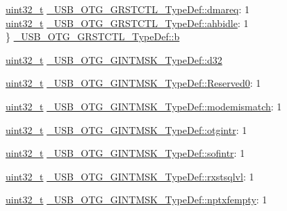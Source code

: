 \begin{DoxyCompactItemize}
\begin{tabbing}
\>\hyperlink{stdint_8h_a435d1572bf3f880d55459d9805097f62}{uint32\_t} \hyperlink{group___u_s_b___o_t_g___d_r_i_v_e_r_gad333c8546ac5b74a5a3ef8eb9377268d}{\_USB\_OTG\_GRSTCTL\_TypeDef::dmareq}: 1\\
\>\hyperlink{stdint_8h_a435d1572bf3f880d55459d9805097f62}{uint32\_t} \hyperlink{group___u_s_b___o_t_g___d_r_i_v_e_r_ga4247e798442e482943bbb22ed25cb1eb}{\_USB\_OTG\_GRSTCTL\_TypeDef::ahbidle}: 1\\
\} \hyperlink{group___u_s_b___o_t_g___d_r_i_v_e_r_ga0286fbf0d92a582c87cf8dc71ac1db47}{\_USB\_OTG\_GRSTCTL\_TypeDef::b}\\

\end{tabbing}\item 
\hyperlink{stdint_8h_a435d1572bf3f880d55459d9805097f62}{uint32\-\_\-t} \hyperlink{group___u_s_b___o_t_g___d_r_i_v_e_r_ga906343e7e2baec7515a156654b58d5df}{\-\_\-\-U\-S\-B\-\_\-\-O\-T\-G\-\_\-\-G\-I\-N\-T\-M\-S\-K\-\_\-\-Type\-Def\-::d32}
\item 
\hyperlink{stdint_8h_a435d1572bf3f880d55459d9805097f62}{uint32\-\_\-t} \hyperlink{group___u_s_b___o_t_g___d_r_i_v_e_r_gae70b4c3c3e4cd67e47bffb922442b1d1}{\-\_\-\-U\-S\-B\-\_\-\-O\-T\-G\-\_\-\-G\-I\-N\-T\-M\-S\-K\-\_\-\-Type\-Def\-::\-Reserved0}\-: 1
\item 
\hyperlink{stdint_8h_a435d1572bf3f880d55459d9805097f62}{uint32\-\_\-t} \hyperlink{group___u_s_b___o_t_g___d_r_i_v_e_r_ga77714304af3ece5bbc8fcd3ba715adc9}{\-\_\-\-U\-S\-B\-\_\-\-O\-T\-G\-\_\-\-G\-I\-N\-T\-M\-S\-K\-\_\-\-Type\-Def\-::modemismatch}\-: 1
\item 
\hyperlink{stdint_8h_a435d1572bf3f880d55459d9805097f62}{uint32\-\_\-t} \hyperlink{group___u_s_b___o_t_g___d_r_i_v_e_r_ga148fbc7761867493dd8af7b29cc5e764}{\-\_\-\-U\-S\-B\-\_\-\-O\-T\-G\-\_\-\-G\-I\-N\-T\-M\-S\-K\-\_\-\-Type\-Def\-::otgintr}\-: 1
\item 
\hyperlink{stdint_8h_a435d1572bf3f880d55459d9805097f62}{uint32\-\_\-t} \hyperlink{group___u_s_b___o_t_g___d_r_i_v_e_r_gace026c7872dc91338173935f546515a6}{\-\_\-\-U\-S\-B\-\_\-\-O\-T\-G\-\_\-\-G\-I\-N\-T\-M\-S\-K\-\_\-\-Type\-Def\-::sofintr}\-: 1
\item 
\hyperlink{stdint_8h_a435d1572bf3f880d55459d9805097f62}{uint32\-\_\-t} \hyperlink{group___u_s_b___o_t_g___d_r_i_v_e_r_ga49f035a272eee9454d65e15275cc76ea}{\-\_\-\-U\-S\-B\-\_\-\-O\-T\-G\-\_\-\-G\-I\-N\-T\-M\-S\-K\-\_\-\-Type\-Def\-::rxstsqlvl}\-: 1
\item 
\hyperlink{stdint_8h_a435d1572bf3f880d55459d9805097f62}{uint32\-\_\-t} \hyperlink{group___u_s_b___o_t_g___d_r_i_v_e_r_gad29b8a77aebfac3c51fd12427d726587}{\-\_\-\-U\-S\-B\-\_\-\-O\-T\-G\-\_\-\-G\-I\-N\-T\-M\-S\-K\-\_\-\-Type\-Def\-::nptxfempty}\-: 1

\end{DoxyCompactItemize}
